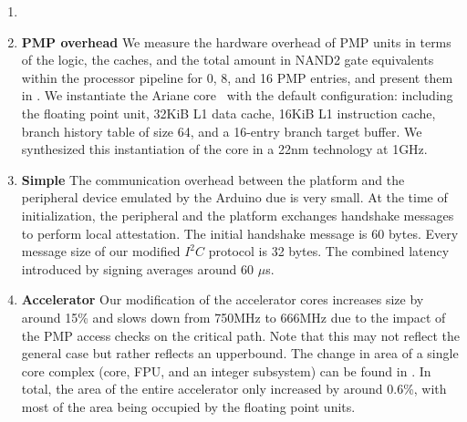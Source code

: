 \begin{enumerate}
\begin{table}[tbp]
    \label{tab:eval:ariane}
\end{table}
\item 


\item \textbf{PMP overhead}
We measure the hardware overhead of PMP units in terms of the logic, the caches, and the total amount in NAND2 gate equivalents within the processor pipeline for 0, 8, and 16 PMP entries, and present them in . We instantiate the Ariane core~\cite{ariane} with the default configuration: including the floating point unit, 32KiB L1 data cache, 16KiB L1 instruction cache, branch history table of size 64, and a 16-entry branch target buffer. We synthesized this instantiation of the core in a 22nm technology at 1GHz. %

\item \textbf{Simple \sphw} The communication overhead between the platform and the peripheral device emulated by the Arduino due is very small. At the time of initialization, the peripheral and the platform exchanges handshake messages to perform local attestation. The initial handshake message is $60$ bytes. Every message size of our modified $I^2C$ protocol is 32 bytes. The combined latency introduced by signing averages around 60 $\mu$s.

\item \textbf{Accelerator} Our modification of the accelerator cores increases size by around 15\% and slows down from 750MHz to 666MHz due to the impact of the PMP access checks on the critical path. Note that this may not reflect the general case but rather reflects an upperbound. The change in area of a single core complex (core, FPU, and an integer subsystem) can be found in . In total, the area of the entire accelerator only increased by around 0.6\%, with most of the area being occupied by the floating point units.
\end{enumerate}






